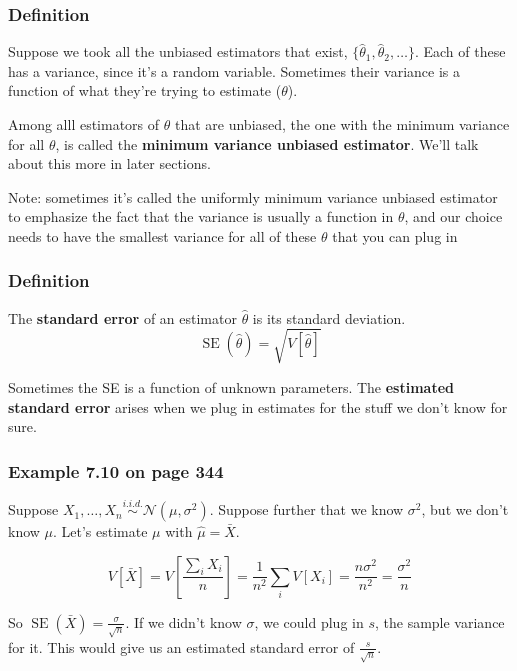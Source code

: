 \documentclass{beamer}
\begin{document}
\begin{frame}
\frametitle{Definition}

Suppose we took all the unbiased estimators that exist, $\{ \hat{\theta}_1, \hat{\theta}_2, \ldots \}$. Each of these has a variance, since it's a random variable. Sometimes their variance is a function of what they're trying to estimate ($\theta$). 
\newline

Among alll estimators of $\theta$ that are unbiased, the one with the minimum variance for all $\theta$, is called the \textbf{minimum variance unbiased estimator}. We'll talk about this more in later sections.
\newline

Note: sometimes it's called the uniformly minimum variance unbiased estimator to emphasize the fact that the variance is usually a function in $\theta$, and our choice needs to have the smallest variance for all of these $\theta$ that you can plug in

\end{frame}



\begin{frame}
\frametitle{Definition}

The \textbf{standard error} of an estimator $\hat{\theta}$ is its standard deviation. 
\[
\operatorname{SE}(\hat{\theta}) = \sqrt{V[\hat{\theta}] }
\]

Sometimes the SE is a function of unknown parameters. The \textbf{estimated standard error} arises when we plug in estimates for the stuff we don't know for sure.

\end{frame}


\begin{frame}
\frametitle{Example 7.10 on page 344}

Suppose $X_1, \ldots, X_n \overset{i.i.d.}{\sim} \mathcal{N}(\mu, \sigma^2)$. Suppose further that we know $\sigma^2$, but we don't know $\mu$. Let's estimate $\mu$ with $\hat{\mu} = \bar{X}$.

\[
V[\bar{X}] = V\left[ \frac{\sum_i X_i}{n} \right] = \frac{1}{n^2} \sum_i V[X_i] = \frac{n \sigma^2}{n^2} = \frac{\sigma^2}{n}
\]

So $\operatorname{SE}(\bar{X}) = \frac{\sigma}{\sqrt{n}}$. If we didn't know $\sigma$, we could plug in $s$, the sample variance for it. This would give us an estimated standard error of $\frac{s}{\sqrt{n}}$.

\end{frame}
\end{document}
